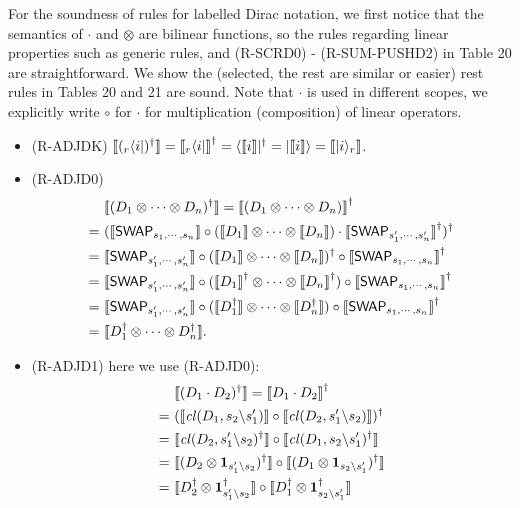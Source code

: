 \documentclass[runningheads]{llncs}
\def\>{\ensuremath{\rangle}}
\def\<{\ensuremath{\langle}}
\newcommand {\Swap } {{\mathsf{SWAP}}}
\begin{document}
For the soundness of rules for labelled Dirac notation, we first notice that the semantics of $\cdot$ and $\otimes$ are bilinear functions, so the rules regarding linear properties such as generic rules, and (R-SCRD0) - (R-SUM-PUSHD2) in Table 20 are straightforward. We show the (selected, the rest are similar or easier) rest rules in Tables 20 and 21 are sound. Note that $\cdot$ is used in different scopes, we explicitly write $\circ$ for $\cdot$ for multiplication (composition) of linear operators.
\begin{itemize}
  \item (R-ADJDK) $\sem{({}_r\<i|)^\dagger} = \sem{{}_r\<i|}^\dagger = \<\sem{i}|^\dagger = |\sem{i}\> = \sem{|i\>_r}$.
  \item (R-ADJD0) 
  \begin{align*}
    &\sem{(D_1\otimes \cdots \otimes D_n)^\dagger}
    = \sem{(D_1\otimes \cdots \otimes D_n)}^\dagger \\
    =\ & (\sem{\Swap_{s_1,\cdots,s_n}} \circ (\sem{D_1}\otimes\cdots\otimes\sem{D_n}) \cdot \sem{\Swap_{s'_1,\cdots,s'_n}}^\dagger)^\dagger  \\ 
    =\ & \sem{\Swap_{s'_1,\cdots,s'_n}} \circ (\sem{D_1}\otimes\cdots\otimes\sem{D_n})^\dagger \circ \sem{\Swap_{s_1,\cdots,s_n}}^\dagger \\ 
    =\ & \sem{\Swap_{s'_1,\cdots,s'_n}} \circ (\sem{D_1}^\dagger\otimes\cdots\otimes\sem{D_n}^\dagger) \circ \sem{\Swap_{s_1,\cdots,s_n}}^\dagger \\ 
    =\ & \sem{\Swap_{s'_1,\cdots,s'_n}} \circ (\sem{D_1^\dagger}\otimes\cdots\otimes\sem{D_n^\dagger}) \circ \sem{\Swap_{s_1,\cdots,s_n}}^\dagger \\ 
    =\ & \sem{D_1^\dagger\otimes \cdots \otimes D_n^\dagger}.
  \end{align*}
  \item (R-ADJD1) here we use (R-ADJD0): 
  \begin{align*}
    &\sem{(D_1 \cdot D_2)^\dagger}
    = \sem{D_1 \cdot D_2}^\dagger \\
    =\ & (\sem{\cl(D_1,s_2\backslash s_1')} \circ \sem{\cl(D_2,s_1'\backslash s_2)})^\dagger  \\ 
    =\ & \sem{\cl(D_2,s_1'\backslash s_2)^\dagger} \circ \sem{\cl(D_1,s_2\backslash s_1')^\dagger}  \\ 
    =\ & \sem{(D_2 \otimes \mathbf{1}_{s_1'\backslash s_2})^\dagger} \circ \sem{(D_1\otimes \mathbf{1}_{s_2\backslash s_1'})^\dagger}  \\ 
    =\ & \sem{D_2^\dagger \otimes \mathbf{1}_{s_1'\backslash s_2}^\dagger} \circ \sem{D_1^\dagger \otimes \mathbf{1}_{s_2\backslash s_1'}^\dagger} \\ 

\end{align*}
\end{itemize}
\end{document}
